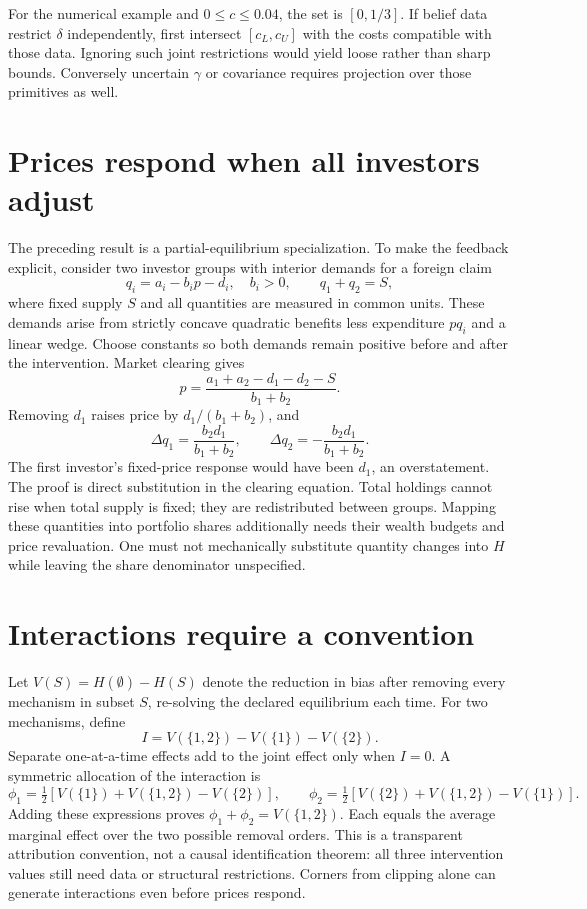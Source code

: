 \documentclass[11pt]{article}
\begin{document}
For the numerical example and $0\leq c\leq0.04$, the set is $[0,1/3]$. If belief data restrict $\delta$ independently, first intersect $[c_L,c_U]$ with the costs compatible with those data. Ignoring such joint restrictions would yield loose rather than sharp bounds. Conversely uncertain $\gamma$ or covariance requires projection over those primitives as well.

\section*{Prices respond when all investors adjust}
The preceding result is a partial-equilibrium specialization. To make the feedback explicit, consider two investor groups with interior demands for a foreign claim
\[
 q_i=a_i-b_i p-d_i,\quad b_i>0,\qquad q_1+q_2=S,
\]
where fixed supply $S$ and all quantities are measured in common units. These demands arise from strictly concave quadratic benefits less expenditure $pq_i$ and a linear wedge. Choose constants so both demands remain positive before and after the intervention. Market clearing gives
\[
 p=\frac{a_1+a_2-d_1-d_2-S}{b_1+b_2}.
\]
Removing $d_1$ raises price by $d_1/(b_1+b_2)$, and
\[
 \Delta q_1=\frac{b_2d_1}{b_1+b_2},\qquad
 \Delta q_2=-\frac{b_2d_1}{b_1+b_2}.
\]
The first investor's fixed-price response would have been $d_1$, an overstatement. The proof is direct substitution in the clearing equation. Total holdings cannot rise when total supply is fixed; they are redistributed between groups. Mapping these quantities into portfolio shares additionally needs their wealth budgets and price revaluation. One must not mechanically substitute quantity changes into $H$ while leaving the share denominator unspecified.

\section*{Interactions require a convention}
Let $V(S)=H(\emptyset)-H(S)$ denote the reduction in bias after removing every mechanism in subset $S$, re-solving the declared equilibrium each time. For two mechanisms, define
\[
 I=V(\{1,2\})-V(\{1\})-V(\{2\}).
\]
Separate one-at-a-time effects add to the joint effect only when $I=0$. A symmetric allocation of the interaction is
\[
 \phi_1=\tfrac12[V(\{1\})+V(\{1,2\})-V(\{2\})],\qquad
 \phi_2=\tfrac12[V(\{2\})+V(\{1,2\})-V(\{1\})].
\]
Adding these expressions proves $\phi_1+\phi_2=V(\{1,2\})$. Each equals the average marginal effect over the two possible removal orders. This is a transparent attribution convention, not a causal identification theorem: all three intervention values still need data or structural restrictions. Corners from clipping alone can generate interactions even before prices respond.
\end{document}
